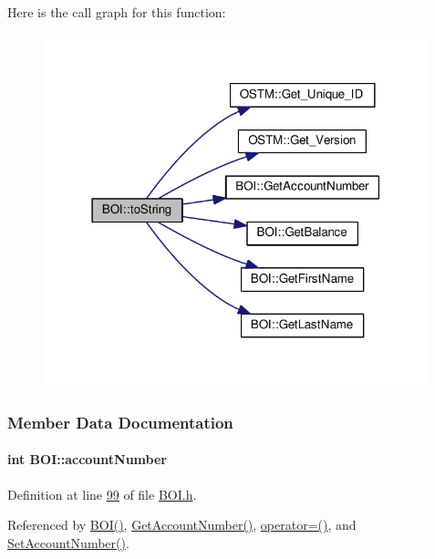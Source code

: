 Here is the call graph for this function\+:
\nopagebreak
\begin{figure}[H]
\begin{center}
\leavevmode
\includegraphics[width=316pt]{class_b_o_i_ab02a4dd4ebcc5b2abfaca19f2dff2006_ab02a4dd4ebcc5b2abfaca19f2dff2006_cgraph}
\end{center}
\end{figure}




\subsubsection{Member Data Documentation}
\paragraph[{\texorpdfstring{account\+Number}{accountNumber}}]{\setlength{\rightskip}{0pt plus 5cm}int B\+O\+I\+::account\+Number\hspace{0.3cm}{\ttfamily [private]}}\hypertarget{class_b_o_i_a35c9fd6e938eb44ad4e076bc6a736851_a35c9fd6e938eb44ad4e076bc6a736851}{}\label{class_b_o_i_a35c9fd6e938eb44ad4e076bc6a736851_a35c9fd6e938eb44ad4e076bc6a736851}


Definition at line \hyperlink{_b_o_i_8h_source_l00099}{99} of file \hyperlink{_b_o_i_8h_source}{B\+O\+I.\+h}.



Referenced by \hyperlink{_b_o_i_8h_source_l00024}{B\+O\+I()}, \hyperlink{_b_o_i_8cpp_source_l00073}{Get\+Account\+Number()}, \hyperlink{_b_o_i_8h_source_l00065}{operator=()}, and \hyperlink{_b_o_i_8cpp_source_l00069}{Set\+Account\+Number()}.

